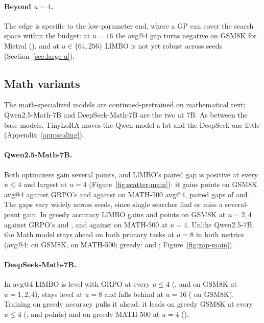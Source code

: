 \documentclass[twoside]{article}
\newcommand{\llmbo}{LlMBO}
\begin{document}
\paragraph{Beyond $u = 4$.} The edge is specific to the low-parameter end, where a GP can cover the search space within the budget: at $u = 16$ the avg@4 gap turns negative on GSM8K for Mistral (\gapToneMeanMistralUSixteenGsm{}), and at $u \in \{64, 256\}$ \llmbo{} is not yet robust across seeds (Section~\ref{sec:large-u}).

\FloatBarrier
\subsection{Math variants}
\label{sec:math}

The math-specialized models are continued-pretrained on mathematical text; Qwen2.5-Math-7B and DeepSeek-Math-7B are the two at 7B. As between the base models, TinyLoRA moves the Qwen model a lot and the DeepSeek one little (Appendix~\ref{app:scaling}).

\paragraph{Qwen2.5-Math-7B.} Both optimizers gain several points, and \llmbo{}'s paired gap is positive at every $u \le 4$ and largest at $u = 4$ (Figure~\ref{fig:scatter-main}): it gains \gainToneMeanMathUFourGsm{} points on GSM8K avg@4 against GRPO's \gainGrpoMeanMathUFourGsm{} and \gainToneMeanMathUFourMathFive{} against \gainGrpoMeanMathUFourMathFive{} on MATH-500 avg@4, paired gaps of \gapToneMeanMathUFourGsm{} and \gapToneMeanMathUFourMathFive{}. The gaps vary widely across seeds, since single searches find or miss a several-point gain. In greedy accuracy \llmbo{} gains \gainGreedyGreedyMathUTwoGsm{} and \gainGreedyGreedyMathUFourGsm{} points on GSM8K at $u = 2, 4$ against GRPO's \gainGrpoGreedyMathUTwoGsm{} and \gainGrpoGreedyMathUFourGsm{}, and \gainGreedyGreedyMathUFourMathFive{} against \gainGrpoGreedyMathUFourMathFive{} on MATH-500 at $u = 4$. Unlike Qwen2.5-7B, the Math model stays ahead on both primary tasks at $u = 8$ in both metrics (avg@4: \gapToneMeanMathUEightGsm{} on GSM8K, \gapToneMeanMathUEightMathFive{} on MATH-500; greedy: \gapGreedyGreedyMathUEightGsm{} and \gapGreedyGreedyMathUEightMathFive{}; Figure~\ref{fig:gap-main}).

\paragraph{DeepSeek-Math-7B.} In avg@4 \llmbo{} is level with GRPO at every $u \le 4$ (\gapToneMeanDeepseekUOneGsm{}, \gapToneMeanDeepseekUTwoGsm{} and \gapToneMeanDeepseekUFourGsm{} on GSM8K at $u = 1, 2, 4$), stays level at $u = 8$ and falls behind at $u = 16$ (\gapToneMeanDeepseekUSixteenGsm{} on GSM8K). Training on greedy accuracy pulls it ahead: it leads on greedy GSM8K at every $u \le 4$ (\gapGreedyGreedyDeepseekUOneGsm{}, \gapGreedyGreedyDeepseekUTwoGsm{} and \gapGreedyGreedyDeepseekUFourGsm{} points) and on greedy MATH-500 at $u = 4$ (\gapGreedyGreedyDeepseekUFourMathFive{}).
\end{document}
